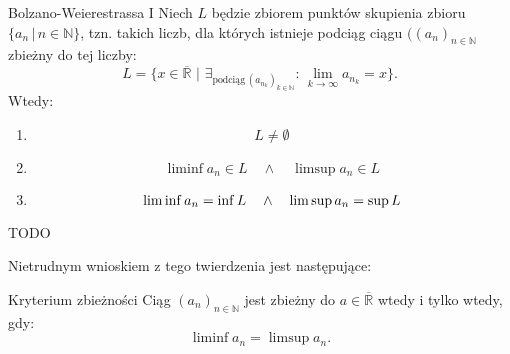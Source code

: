 \documentclass{article}
\numberwithin{defi}{section}
\numberwithin{defi}{section}
\newcommand{\R}{\mathbb{R}}
\newcommand{\Rbar}{\overline{\mathbb{R}}}
\newcommand{\N}{\mathbb{N}}
\renewcommand{\inf}{\mathop{\mathrm{inf}\vphantom{\mathrm{sup}}}}
\newcommand{\ciag}[1]{(#1_{n})_{n \in \N}}
\begin{document}
\begin{twier}{Bolzano-Weierestrassa I} \label{twier:BL I}
    Niech $L$ będzie zbiorem punktów skupienia zbioru $\{a_n \, | \, n \in \N\}$, tzn. takich liczb, dla których istnieje podciąg ciągu $(\ciag{a}$ zbieżny do tej liczby: \begin{equation}
        L = \{ x \in \overline{\R} \,\, | \,\, \exists_{\text{podciąg} \, (a_{n_k})_{k \in \N}} : \, \lim_{k \to \infty} a_{n_k} = x \}.
    \end{equation}
    Wtedy:
    \begin{enumerate}
        \item \begin{equation}
                  L \neq \emptyset
              \end{equation}
        \item \begin{equation}
                  \liminf{a_n} \in L  \quad \land \quad \limsup{a_n} \in L
              \end{equation}
        \item \begin{equation}
                  \liminf{a_n} = \inf{L} \quad \land \quad \limsup{a_n} = \sup{L}
              \end{equation}
    \end{enumerate}
\end{twier}

\begin{dow}
    TODO
\end{dow}

Nietrudnym wnioskiem z tego twierdzenia jest następujące:
\begin{twier}{Kryterium zbieżności}
    Ciąg $\ciag{a}$ jest zbieżny do $a \in \Rbar$ wtedy i tylko wtedy, gdy: \begin{equation}
        \liminf a_n = \limsup a_n.
    \end{equation}
\end{twier}
\end{document}
